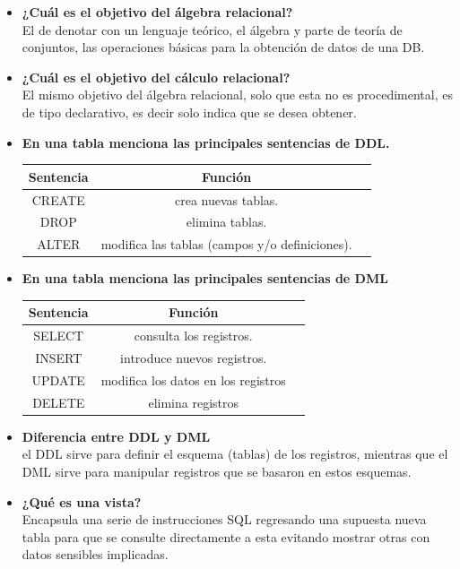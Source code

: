 \documentclass[spanish,12pt,letterpapper]{article}
\begin{document}
	\begin{itemize}
	
\item \textbf{¿Cuál es el objetivo del álgebra relacional?\\}
El de denotar con un lenguaje teórico, el álgebra y parte de teoría de conjuntos, las operaciones básicas para la obtención de datos de una DB.\\
	
\item \textbf{¿Cuál es el objetivo del cálculo relacional?\\}
El mismo objetivo del álgebra relacional, solo que esta no es procedimental, es de tipo declarativo, es decir solo indica que se desea obtener.\\

\item \textbf{En una tabla menciona las principales sentencias de DDL.\\}
\begin{center}
\begin{tabular}{|c|c|c|}
\hline
\textbf{Sentencia} & \textbf{Función}\\
\hline
CREATE & crea nuevas tablas.\\
\hline
DROP & elimina tablas.\\
\hline
ALTER & modifica las tablas (campos y/o definiciones).\\
\hline
\end{tabular}
\end{center}

\item \textbf{En una tabla menciona las principales sentencias de DML\\}
\begin{center}
\begin{tabular}{|c|c|c|}
\hline
\textbf{Sentencia} & \textbf{Función}\\
\hline
SELECT & consulta los registros.\\
\hline
INSERT & introduce nuevos registros.\\
\hline
UPDATE & modifica los datos en los registros\\
\hline
DELETE & elimina registros\\
\hline
\end{tabular}
\end{center}

\item \textbf{Diferencia entre DDL y DML\\}
el DDL sirve para definir el esquema (tablas) de los registros, mientras que el DML sirve para manipular registros que se basaron en estos esquemas.\\

\item \textbf{¿Qué es una vista?\\}
Encapsula una serie de instrucciones SQL regresando una supuesta nueva tabla para que se consulte directamente a esta evitando mostrar otras con datos sensibles implicadas.\\

	\end{itemize}
	
\end{document}
